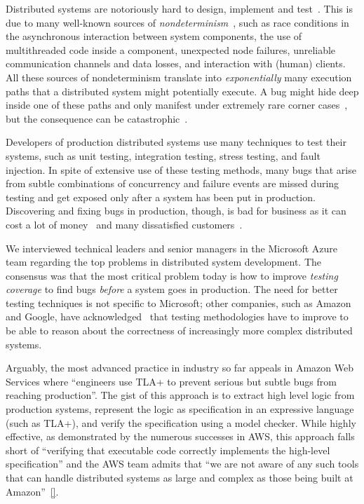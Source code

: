 Distributed systems are notoriously hard to design, implement and test~\cite{cavage2013there, laguna2015debugging, maddox2015test}. This is due to many well-known sources of \emph{nondeterminism}~\cite{chandra2007paxos}, such as race conditions in the asynchronous interaction between system components, the use of multithreaded code inside a component, unexpected node failures, unreliable communication channels and data losses, and interaction with (human) clients.
All these sources of nondeterminism translate into \emph{exponentially} many execution paths that a distributed system might potentially execute.
A bug might hide deep inside one of these paths and only manifest under extremely rare corner cases~\cite{gray1986computers, musuvathi2008finding}, but the consequence can be catastrophic~\cite{amazon2012aws, google2014outage}.

Developers of production distributed systems use many techniques to test their systems,
such as unit testing, integration testing, stress testing, and fault injection.
In spite of extensive use of these testing methods,
many bugs that arise from subtle combinations of concurrency and failure events
are missed during testing and get exposed only after a system has been put in production.
Discovering and fixing bugs in production, though, is bad for business as it can cost a lot of money~\cite{tassey2002economic} 
and many dissatisfied customers~\cite{amazon2012aws, google2014outage}.

We interviewed technical leaders and senior managers in the Microsoft Azure team regarding the top problems in distributed system development.
The consensus was that the most critical problem today is how to improve \emph{testing coverage} to find bugs \emph{before} a system goes in production.
The need for better testing techniques is not specific to Microsoft;
other companies, such as Amazon and Google, have acknowledged~\cite{chandra2007paxos,newcombe2015aws} that testing methodologies have to improve to be able to reason about the correctness of increasingly more complex distributed systems.

Arguably, the most advanced practice in industry so far appeals in Amazon Web Services where ``engineers use TLA+ to prevent serious but subtle bugs from reaching production''. The gist of this approach is to extract high level logic from production systems, represent the logic as specification in an expressive language (such as TLA+), and verify the specification using a model checker. While highly effective, as demonstrated by the numerous successes in AWS, this approach falls short of ``verifying that executable code correctly implements the high-level specification'' and the AWS team admits that ``we are not aware of any such tools that can handle distributed systems as large and complex as those being built at Amazon''~\ref{}.

